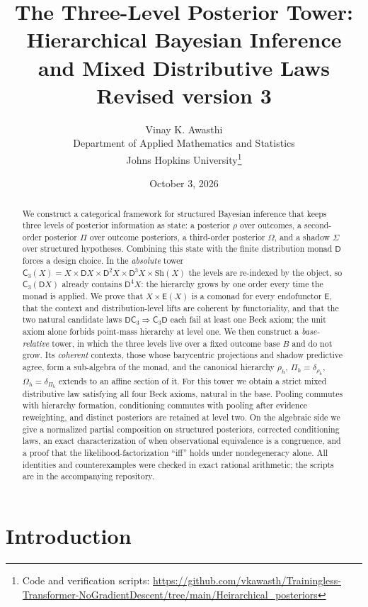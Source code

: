\documentclass[11pt]{article}
\title{The Three-Level Posterior Tower:\\
Hierarchical Bayesian Inference and Mixed Distributive Laws\\[4pt]
\large Revised version 3}
\author{Vinay K. Awasthi\\
Department of Applied Mathematics and Statistics\\
Johns Hopkins University\thanks{Code and verification scripts:
\url{https://github.com/vkawasth/Trainingless-Transformer-NoGradientDescent/tree/main/Heirarchical_posteriors}}}
\date{October 3, 2026}
\theoremstyle{definition}
\theoremstyle{remark}
\newcommand{\D}{\mathsf{D}}
\newcommand{\Sh}{\mathrm{Sh}}
\newcommand{\C}{\mathsf{C}}
\newcommand{\E}{\mathsf{E}}
\begin{document}
\maketitle

\begin{abstract}
We construct a categorical framework for structured Bayesian inference that keeps three levels of
posterior information as state: a posterior $\rho$ over outcomes, a second-order posterior $\Pi$ over
outcome posteriors, a third-order posterior $\Omega$, and a shadow $\Sigma$ over structured hypotheses.
Combining this state with the finite distribution monad $\D$ forces a design choice. In the
\emph{absolute} tower $\C_3(X)=X\times\D X\times\D^2X\times\D^3X\times\Sh(X)$ the levels are
re-indexed by the object, so $\C_3(\D X)$ already contains $\D^4X$: the hierarchy grows by one order
every time the monad is applied. We prove that $X\times\E(X)$ is a comonad for every endofunctor $\E$,
that the context and distribution-level lifts are coherent by functoriality, and that the two natural
candidate laws $\D\C_3\Rightarrow\C_3\D$ each fail at least one Beck axiom; the unit axiom alone forbids
point-mass hierarchy at level one. We then construct a \emph{base-relative} tower, in which the three
levels live over a fixed outcome base $B$ and do not grow. Its \emph{coherent} contexts, those whose
barycentric projections and shadow predictive agree, form a sub-algebra of the monad, and the
canonical hierarchy $\rho_h$, $\Pi_h=\delta_{\rho_h}$, $\Omega_h=\delta_{\Pi_h}$ extends to an affine
section of it. For this tower we obtain a strict mixed distributive law satisfying all four Beck
axioms, natural in the base. Pooling commutes with hierarchy formation, conditioning commutes with
pooling after evidence reweighting, and distinct posteriors are retained at level two. On the
algebraic side we give a normalized partial composition on structured posteriors, corrected
conditioning laws, an exact characterization of when observational equivalence is a congruence, and
a proof that the likelihood-factorization ``iff'' holds under nondegeneracy alone. All identities and
counterexamples were checked in exact rational arithmetic; the scripts are in the accompanying
repository.
\end{abstract}

\tableofcontents

\section{Introduction}
\end{document}
